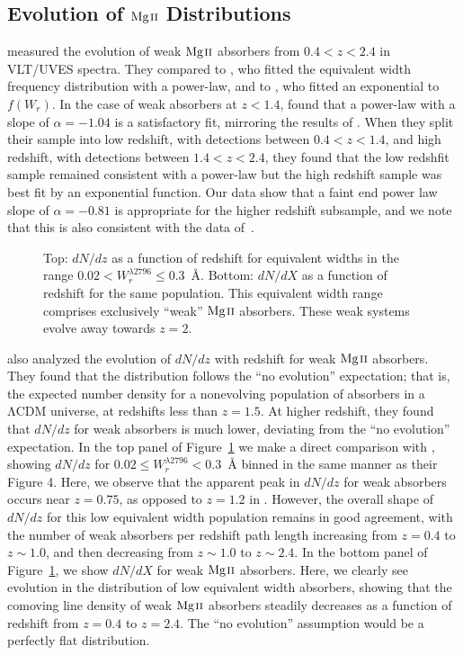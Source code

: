 \documentclass[iop,apj,numberedappendix,appendixfloats,twocolappendix]{emulateapj}
\begin{document}
\subsection{Evolution of ${\hbox{{\rm Mg}\kern 0.1em{\sc ii}}}$ Distributions}

\cite{Narayanan2007} measured the evolution of weak ${\hbox{{\rm Mg}\kern 0.1em{\sc ii}}}$ absorbers from $0.4 < z < 2.4$ in VLT/UVES spectra. They compared to \cite{Churchill1999}, who fitted the equivalent width frequency distribution with a power-law, and to \cite{Nestor2005}, who fitted an exponential to $f(W_r)$. In the case of weak absorbers at $z < 1.4$, \cite{Narayanan2007} found that a power-law with a slope of $\alpha = -1.04$ is a satisfactory fit, mirroring the results of \cite{Churchill1999}. When they split their sample into low redshift, with detections between $0.4 < z < 1.4$, and high redshift, with detections between $1.4 < z < 2.4$, they found that the low redshfit sample remained consistent with a power-law but the high redshift sample was best fit by an exponential function. Our data show that a faint end power law slope of $\alpha = -0.81$ is appropriate for the higher redshift subsample, and we note that this is also consistent with the data of~\cite{Narayanan2007}.

\begin{figure}[bth]
\caption{Top: $dN\!/dz$ as a function of redshift for equivalent widths in the range $0.02 < W_{r}^{\lambda2796} \le 0.3$~{\AA}. Bottom: $dN\!/dX$ as a function of redshift for the same population. This equivalent width range comprises exclusively ``weak'' ${\hbox{{\rm Mg}\kern 0.1em{\sc ii}}}$ absorbers. These weak systems evolve away towards $z = 2$.}
\label{fig:dndzbetween}
\end{figure}

\cite{Narayanan2007} also analyzed the evolution of $dN\!/dz$ with redshift for weak ${\hbox{{\rm Mg}\kern 0.1em{\sc ii}}}$ absorbers. They found that the distribution follows the ``no evolution'' expectation; that is, the expected number density for a nonevolving population of absorbers in a $\mathrm{\Lambda CDM}$ universe, at redshifts less than $z = 1.5$. At higher redshift, they found that $dN\!/dz$ for weak absorbers is much lower, deviating from the ``no evolution'' expectation. In the top panel of Figure~\ref{fig:dndzbetween} we make a direct comparison with \cite{Narayanan2007}, showing $dN\!/dz$ for $0.02 \le W_r^{\lambda2796} < 0.3$~{\AA} binned in the same manner as their Figure 4. Here, we observe that the apparent peak in $dN\!/dz$ for weak absorbers occurs near $z = 0.75$, as opposed to $z = 1.2$ in \cite{Narayanan2007}. However, the overall shape of $dN\!/dz$ for this low equivalent width population remains in good agreement, with the number of weak absorbers per redshift path length increasing from $z = 0.4$ to $z \sim 1.0$, and then decreasing from $z \sim 1.0$ to $z \sim 2.4$. In the bottom panel of Figure~\ref{fig:dndzbetween}, we show $dN\!/dX$ for weak ${\hbox{{\rm Mg}\kern 0.1em{\sc ii}}}$ absorbers. Here, we clearly see evolution in the distribution of low equivalent width absorbers, showing that the comoving line density of weak ${\hbox{{\rm Mg}\kern 0.1em{\sc ii}}}$ absorbers steadily decreases as a function of redshift from $z = 0.4$ to $z = 2.4$. The ``no evolution'' assumption would be a perfectly flat distribution. 
\end{document}
